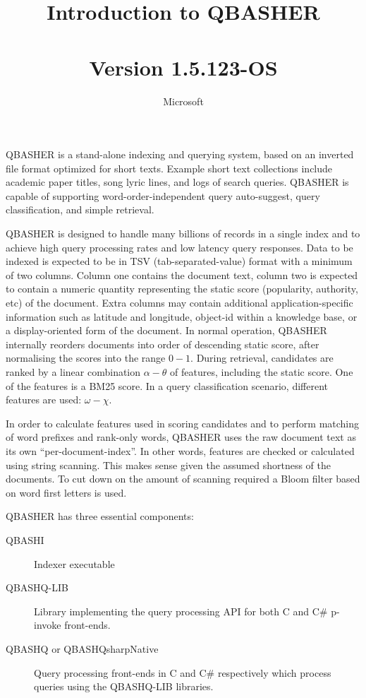 \documentclass{article}
\title{Introduction to QBASHER\\
  \large ~\\
  Version 1.5.123-OS}
\author{Microsoft}
\begin{document}
\maketitle{}


QBASHER is a stand-alone indexing and querying system, based on an
inverted file format optimized for short texts.  Example short text
collections include academic paper titles, song lyric lines, and logs
of search queries.  QBASHER is capable of supporting
word-order-independent query auto-suggest, query
classification, and simple retrieval.

QBASHER is designed to handle many billions of records in a single
index and to achieve high query processing rates and low latency query
responses.  Data to be indexed is expected to be in TSV
(tab-separated-value) format with a
minimum of two columns.  Column one contains the document text, column
two is expected to contain a numeric quantity representing the static
score (popularity, authority, etc) of the document. Extra columns
may contain additional application-specific information such as
latitude and longitude, object-id within a knowledge base, or a
display-oriented form of the document.   In normal operation, QBASHER
internally reorders documents into order of descending static score,
after normalising the scores into the range $0-1$.  During retrieval,
candidates are ranked by a linear combination $\alpha - \theta$ of
features, including the static score.  One of the features is a BM25
score. In a query classification scenario, different features are
used: $\omega - \chi$.

In order to calculate features used in scoring candidates and to
perform matching of word prefixes and rank-only words, QBASHER uses
the raw document text as its own ``per-document-index''.  In other
words, features are checked or calculated using string scanning.  This
makes sense given the assumed shortness of the documents.  To cut down
on the amount of scanning required a Bloom filter based on word first
letters is used.

QBASHER has three essential components:

\begin{description}
\item [QBASHI] Indexer executable
  \item [QBASHQ-LIB] Library implementing the query processing API for
    both C and C\# p-invoke front-ends.
    \item [QBASHQ or QBASHQsharpNative] Query processing front-ends
      in C and C\# respectively which process queries using the
      QBASHQ-LIB libraries.
\end{description}
\end{document}
